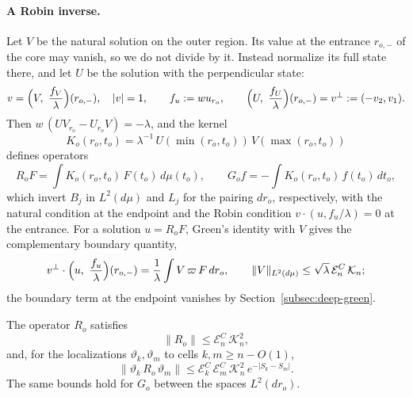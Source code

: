 \paragraph{A Robin inverse.}
Let $V$ be the natural solution on the outer region. Its value at the
entrance $r_{o,-}$ of the core may vanish, so we do not divide by it.
Instead normalize its full state there, and let $U$ be the solution
with the perpendicular state:
\begin{equation}\label{eq:rad-eq-tm1}
 v=\Bigl(V,\ \frac{f_V}{\lambda}\Bigr)(r_{o,-}),\quad |v|=1,
 \qquad f_u:=wu_{r_o},
 \qquad \Bigl(U,\ \frac{f_U}{\lambda}\Bigr)(r_{o,-})=v^\perp:=(-v_2,v_1).
\end{equation}
Then $w\,(UV_{r_o}-U_{r_o}V)=-\lambda$, and the kernel
\[
 K_o(r_o,t_o)=\lambda^{-1}\,U(\min(r_o,t_o))\,V(\max(r_o,t_o))
\]
defines operators
\begin{equation}\label{eq:outer-robin-new}
 R_oF=\int K_o(r_o,t_o)\,F(t_o)\,d\mu(t_o),\qquad
 G_of=-\int K_o(r_o,t_o)\,f(t_o)\,dt_o ,
\end{equation}
which invert $B_j$ in $L^2(d\mu)$ and $L_j$ for the pairing $dr_o$,
respectively, with the natural condition at the endpoint and the
Robin condition $v\cdot(u,f_u/\lambda)=0$ at the entrance. For a
solution $u=R_oF$, Green's identity with $V$ gives the complementary
boundary quantity,
\begin{equation}\label{eq:rad-eq-tm2}
 v^\perp\cdot\Bigl(u,\ \frac{f_u}{\lambda}\Bigr)(r_{o,-})
       =\frac1\lambda\int V\,\varpi\,F\,dr_o,
 \qquad \|V\|_{L^2(d\mu)}\le\sqrt\lambda\,\mathcal E_n^C\,\mathcal K_n ;
\end{equation}
the boundary term at the endpoint vanishes by
Section~\ref{subsec:deep-green}.

\begin{lemma}\label{lem:outer-inverse}
The operator $R_o$ satisfies
\begin{equation}\label{eq:rad-eq-tm3}
 \|R_o\|\le\mathcal E_n^C\,\mathcal K_n^2 ,
\end{equation}
and, for the localizations $\vartheta_k,\vartheta_m$ to cells
$k,m\ge n-O(1)$,
\begin{equation}\label{eq:rad-eq-tm4}
 \|\vartheta_k\,R_o\,\vartheta_m\|
 \le\mathcal E_k^C\,\mathcal E_m^C\,\mathcal K_n^2\,e^{-|S_k-S_m|}.
\end{equation}
The same bounds hold for $G_o$ between the spaces $L^2(dr_o)$.
\end{lemma}

